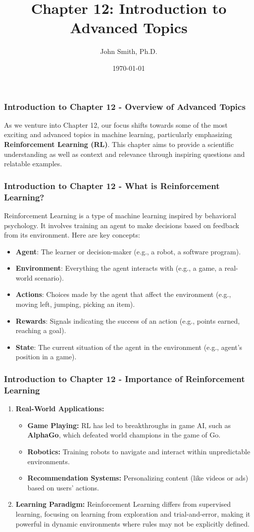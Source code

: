 \documentclass[aspectratio=169]{beamer}
\title[Chapter 12: Introduction to Advanced Topics]{Chapter 12: Introduction to Advanced Topics}
\author[J. Smith]{John Smith, Ph.D.}
\institute[University Name]{
  Department of Computer Science\\
  University Name\\
  \vspace{0.3cm}
  Email: email@university.edu\\
  Website: www.university.edu
}
\date{\today}
\begin{document}
\frame{\titlepage}

\begin{frame}[fragile]
    \frametitle{Introduction to Chapter 12 - Overview of Advanced Topics}
    As we venture into Chapter 12, our focus shifts towards some of the most exciting and advanced topics in machine learning, particularly emphasizing \textbf{Reinforcement Learning (RL)}. 
    This chapter aims to provide a scientific understanding as well as context and relevance through inspiring questions and relatable examples.
\end{frame}

\begin{frame}[fragile]
    \frametitle{Introduction to Chapter 12 - What is Reinforcement Learning?}
    Reinforcement Learning is a type of machine learning inspired by behavioral psychology. It involves training an agent to make decisions based on feedback from its environment. Here are key concepts:
    \begin{itemize}
        \item \textbf{Agent}: The learner or decision-maker (e.g., a robot, a software program).
        \item \textbf{Environment}: Everything the agent interacts with (e.g., a game, a real-world scenario).
        \item \textbf{Actions}: Choices made by the agent that affect the environment (e.g., moving left, jumping, picking an item).
        \item \textbf{Rewards}: Signals indicating the success of an action (e.g., points earned, reaching a goal).
        \item \textbf{State}: The current situation of the agent in the environment (e.g., agent’s position in a game).
    \end{itemize}
\end{frame}

\begin{frame}[fragile]
    \frametitle{Introduction to Chapter 12 - Importance of Reinforcement Learning}
    \begin{enumerate}
        \item \textbf{Real-World Applications:}
        \begin{itemize}
            \item \textbf{Game Playing:} RL has led to breakthroughs in game AI, such as \textbf{AlphaGo}, which defeated world champions in the game of Go.
            \item \textbf{Robotics:} Training robots to navigate and interact within unpredictable environments.
            \item \textbf{Recommendation Systems:} Personalizing content (like videos or ads) based on users' actions.
        \end{itemize}
        \item \textbf{Learning Paradigm:} Reinforcement Learning differs from supervised learning, focusing on learning from exploration and trial-and-error, making it powerful in dynamic environments where rules may not be explicitly defined.
    \end{enumerate}
\end{frame}
\end{document}
